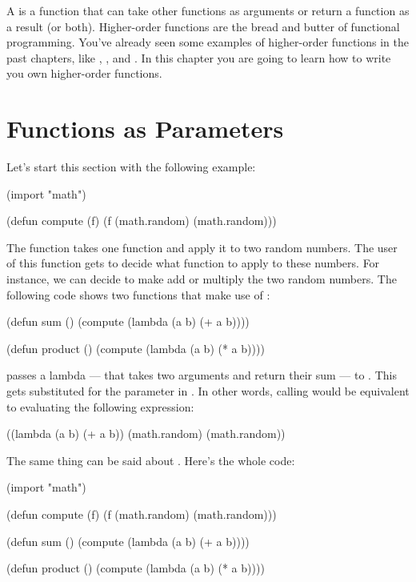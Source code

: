 A  is a function that can take other functions as arguments or return a function as a result (or both). Higher-order functions are the bread and butter of functional programming. You've already seen some examples of higher-order functions in the past chapters, like , , and . In this chapter you are going to learn how to write you own higher-order functions.

\section{Functions as Parameters}
Let's start this section with the following example:

\begin{REPL}
(import "math")

(defun compute (f) 
  (f (math.random) (math.random)))
\end{REPL}

The  function takes one function and apply it to two random numbers. The user of this function gets to decide what function to apply to these numbers. For instance, we can decide to make  add or multiply the two random numbers. The following code shows two functions that make use of :

\begin{REPL}
(defun sum ()
  (compute (lambda (a b) (+ a b))))
  
(defun product ()
  (compute (lambda (a b) (* a b))))
\end{REPL}

 passes a lambda --- that takes two arguments and return their sum --- to . This gets substituted for the parameter  in . In other words, calling  would be equivalent to evaluating the following expression:

\begin{REPL}
((lambda (a b) (+ a b)) 
	(math.random) (math.random))
\end{REPL}

The same thing can be said about . Here's the whole code:
\begin{REPL}
(import "math")

(defun compute (f) 
  (f (math.random) (math.random)))

(defun sum ()
  (compute (lambda (a b) (+ a b))))

(defun product ()
  (compute (lambda (a b) (* a b))))
\end{REPL}

